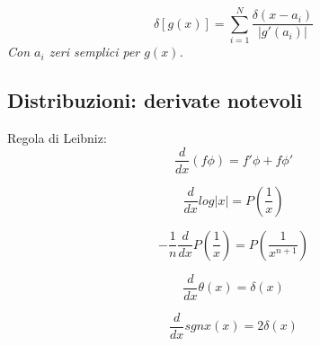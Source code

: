\documentclass[a4paper, 11pt]{article}
\newcommand{\dx}[0]{\frac{d}{dx}}{}
\begin{document}
\begin{equation}
    \delta [g(x)] = \sum_{i=1}^N \frac{\delta (x-a_i)}{|g'(a_i)|}
\end{equation}
\emph{Con $a_i$ zeri semplici per $g(x)$.}


\vspace{3cm}
\hrulefill
\begin{centering}
\section{Distribuzioni: derivate notevoli}
\end{centering}

Regola di Leibniz:
\begin{equation}
    \dx (f \phi) = f' \phi + f \phi' 
\end{equation}

\begin{equation}
    \dx log |x| = P \left( \frac{1}{x} \right)
\end{equation}

\begin{equation}
    - \frac{1}{n} \dx P \left( \frac{1}{x} \right) = P \left( \frac{1}{x^{n+1}} \right)
\end{equation}

\begin{equation}
    \dx \theta (x) = \delta (x)
\end{equation}

\begin{equation}
    \dx sgnx (x) = 2 \delta(x)
\end{equation}
\end{document}
